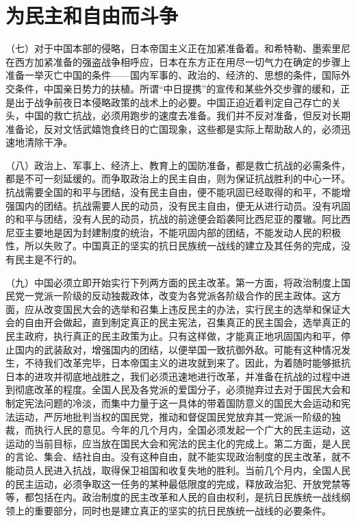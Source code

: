\section{为民主和自由而斗争}

（七）对于中国本部的侵略，日本帝国主义正在加紧准备着。和希特勒、墨索里尼在西方加紧准备的强盗战争相呼应，日本在东方正在用尽一切气力在确定的步骤上准备一举灭亡中国的条件——国内军事的、政治的、经济的、思想的条件，国际外交条件，中国亲日势力的扶植。所谓“中日提携”的宣传和某些外交步骤的缓和，正是出于战争前夜日本侵略政策的战术上的必要。中国正迫近着判定自己存亡的关头，中国的救亡抗战，必须用跑步的速度去准备。我们并不反对准备，但反对长期准备论，反对文恬武嬉饱食终日的亡国现象，这些都是实际上帮助敌人的，必须迅速地清除干净。

（八）政治上、军事上、经济上、教育上的国防准备，都是救亡抗战的必需条件，都是不可一刻延缓的。而争取政治上的民主自由，则为保证抗战胜利的中心一环。抗战需要全国的和平与团结，没有民主自由，便不能巩固已经取得的和平，不能增强国内的团结。抗战需要人民的动员，没有民主自由，便无从进行动员。没有巩固的和平与团结，没有人民的动员，抗战的前途便会蹈袭阿比西尼亚的覆辙。阿比西尼亚主要地是因为封建制度的统治，不能巩固内部的团结，不能发动人民的积极性，所以失败了。中国真正的坚实的抗日民族统一战线的建立及其任务的完成，没有民主是不行的。

（九）中国必须立即开始实行下列两方面的民主改革。第一方面，将政治制度上国民党一党派一阶级的反动独裁政体，改变为各党派各阶级合作的民主政体。这方面，应从改变国民大会的选举和召集上违反民主的办法，实行民主的选举和保证大会的自由开会做起，直到制定真正的民主宪法，召集真正的民主国会，选举真正的民主政府，执行真正的民主政策为止。只有这样做，才能真正地巩固国内和平，停止国内的武装敌对，增强国内的团结，以便举国一致抗御外敌。可能有这种情况发生，不待我们改革完毕，日本帝国主义的进攻就到来了。因此，为着随时能够抵抗日本的进攻并彻底地战胜之，我们必须迅速地进行改革，并准备在抗战的过程中进到彻底改革的程度。全国人民及各党派的爱国分子，必须抛弃过去对于国民大会和制定宪法问题的冷淡，而集中力量于这一具体的带着国防意义的国民大会运动和宪法运动，严厉地批判当权的国民党，推动和督促国民党放弃其一党派一阶级的独裁，而执行人民的意见。今年的几个月内，全国必须发起一个广大的民主运动，这运动的当前目标，应当放在国民大会和宪法的民主化的完成上。第二方面，是人民的言论、集会、结社自由。没有这种自由，就不能实现政治制度的民主改革，就不能动员人民进入抗战，取得保卫祖国和收复失地的胜利。当前几个月内，全国人民的民主运动，必须争取这一任务的某种最低限度的完成，释放政治犯、开放党禁等等，都包括在内。政治制度的民主改革和人民的自由权利，是抗日民族统一战线纲领上的重要部分，同时也是建立真正的坚实的抗日民族统一战线的必要条件。

